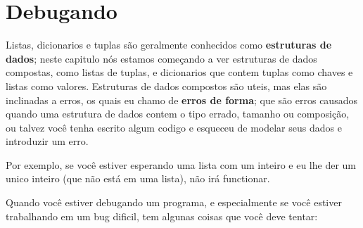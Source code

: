 

\section{Debugando}


Listas, dicionarios e tuplas são geralmente conhecidos como {\bf estruturas
de dados}; neste capitulo nós estamos começando a ver estruturas de dados
compostas, como listas de tuplas, e dicionarios que contem tuplas como
chaves e listas como valores. Estruturas de dados compostos são uteis, mas
elas são inclinadas a erros, os quais eu chamo de {\bf erros de forma};
que são erros causados quando uma estrutura de dados contem o tipo errado,
tamanho ou composição, ou talvez você tenha escrito algum codigo e esqueceu de 
modelar seus dados e introduzir um erro.

Por exemplo, se você estiver esperando uma lista com um inteiro e eu
lhe der um unico inteiro (que não está em uma lista), não irá functionar.

Quando você estiver debugando um programa, e especialmente se você
estiver trabalhando em um bug dificil, tem algunas coisas que você 
deve tentar:

